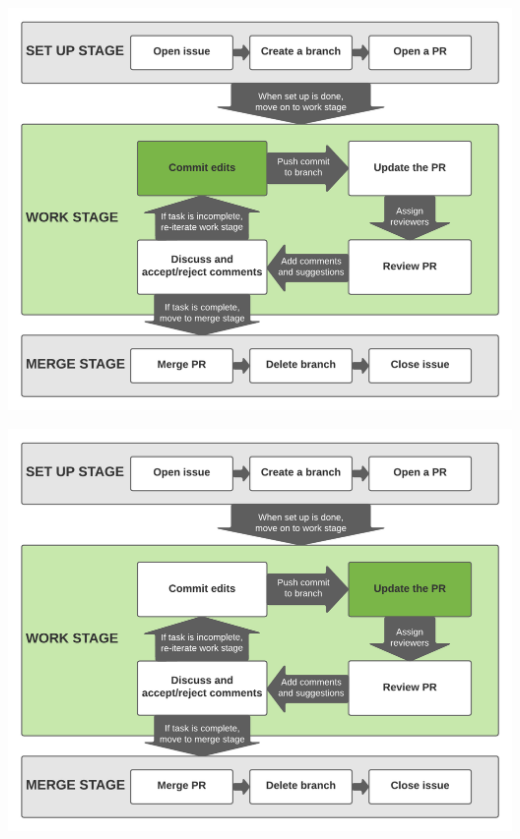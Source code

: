 \documentclass[aspectratio=169]{beamer} %
\begin{document}
\begin{frame}
	\includegraphics[width=\textwidth]{./img/branch-pr-merge-cycle-S2-1.png}
\end{frame}

\begin{frame}
	\includegraphics[width=\textwidth]{./img/branch-pr-merge-cycle-S2-2.png}
\end{frame}
\end{document}
